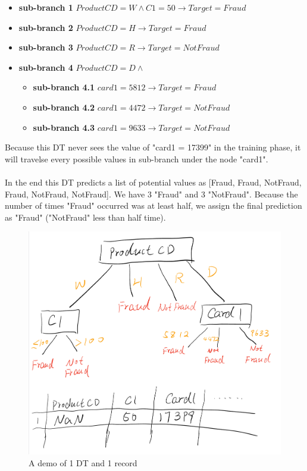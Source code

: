\documentclass{article}
\begin{document}
\begin{itemize}
    \item \textbf{sub-branch 1} $ProductCD = W \land C1 = 50\rightarrow Target = Fraud$
    \item \textbf{sub-branch 2} $ProductCD = H \rightarrow Target = Fraud$
    \item \textbf{sub-branch 3} $ProductCD = R \rightarrow Target = NotFraud$
    \item \textbf{sub-branch 4} $ProductCD = D \land$
    \begin{itemize}
        \item \textbf{sub-branch 4.1} $card1 = 5812 \rightarrow Target = Fraud$
        \item \textbf{sub-branch 4.2} $card1 = 4472 \rightarrow Target = NotFraud$
        \item \textbf{sub-branch 4.3} $card1 = 9633 \rightarrow Target = NotFraud$
    \end{itemize}
\end{itemize}
Because this DT never sees the value of "card1 = 17399" in the training phase, it will travelse every possible values in sub-branch under the node "card1". \\\\
In the end this DT predicts a list of potential values as [Fraud, Fraud, NotFraud, Fraud, NotFraud, NotFraud]. We have 3 "Fraud" and 3 "NotFraud". Because the number of times "Fraud" occurred was at least half, we assign the final prediction as "Fraud" ("NotFraud" less than half time).

\begin{figure}[H]
  \centering
  \includegraphics[width=1\linewidth]{Fig/NaN_test.jpeg}
  \caption{\label{fig:1}A demo of 1 DT and 1 record}
\end{figure}
\end{document}
